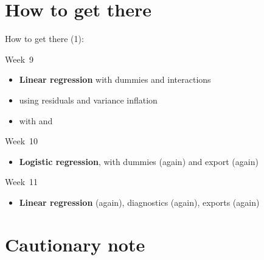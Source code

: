 \documentclass[t]{beamer}
\begin{document}
	\section{How to get there}

	\begin{frame}[t]{How to get there (1): }

		\begin{block}{Week~9}

			\begin{itemize}
				\item \textbf{Linear regression} with dummies and interactions
        \item {} using residuals and variance inflation
        \item {} with  and 
			\end{itemize}
			
		\end{block}

		\begin{block}{Week~10}

			\begin{itemize}
				\item \textbf{Logistic regression}, with dummies (again) and export (again)%
			\end{itemize}
			
		\end{block}

		\begin{block}{Week~11}

			\begin{itemize}
				\item \textbf{Linear regression} (again), diagnostics (again), exports (again)%
			\end{itemize}
			
		\end{block}

	\end{frame}
  

	\section{Cautionary note}
\end{document}
